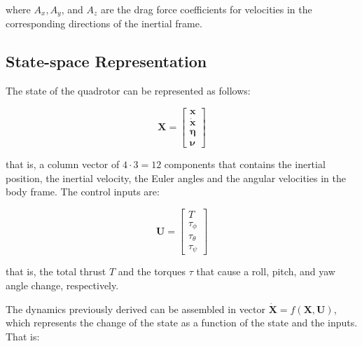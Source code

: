 \documentclass[letterpaper, 10 pt, conference]{ieeeconf}  %
\begin{document}
  where $A_x, A_y$, and $A_z$ are the drag force coefficients for velocities in the corresponding directions of the inertial frame.
 
\subsection{State-space Representation}

The state of the quadrotor can be represented as follows:

 $$ \bm{X} = \left[ 
 \begin{array}{c}
  {\bm{x}}  \\
  {\bm{\dot{x}}}  \\
  {\bm{\eta}}  \\
  {\bm{\nu}}
  \end{array}\right]$$

that is, a column vector of $4 \cdot 3 = 12$ components that contains the inertial position, the inertial velocity, the Euler angles and the angular velocities in the body frame. The control inputs are:

 $$ \bm{U} = \left[ 
 \begin{array}{c}
 {T}  \\
 {\tau_\phi}  \\
 {\tau_\theta}  \\
 {\tau_\psi}
 \end{array}\right]$$
 
 that is, the total thrust $T$ and the torques $\tau$ that cause a roll, pitch, and yaw angle change, respectively.
 
 The dynamics previously derived can be assembled in vector $\bm{\dot{X}} = f(\boldsymbol{X}, \boldsymbol{U})$, which represents the change of the state as a function of the state and the inputs. That is:
 
\end{document}

